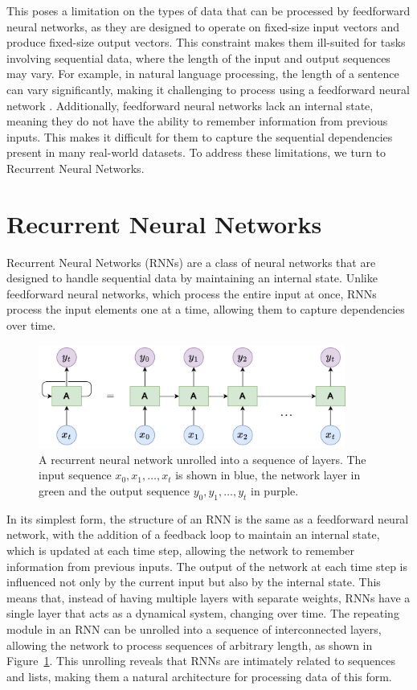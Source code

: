 \documentclass{article}
\newcommand{\reffig}[1]{Figure~\ref{#1}}
\begin{document}
This poses a limitation on the types of data that can be processed by feedforward neural
networks, as they are designed to operate on fixed-size input vectors and produce
fixed-size output vectors. This constraint makes them ill-suited for tasks involving
sequential data, where the length of the input and output sequences may vary. For example,
in natural language processing, the length of a sentence can vary significantly, making it
challenging to process using a feedforward neural network \cite{Sundermeyer2015}.
Additionally, feedforward neural networks lack an internal state, meaning they do not have
the ability to remember information from previous inputs. This makes it difficult for them
to capture the sequential dependencies present in many real-world datasets. To address
these limitations, we turn to Recurrent Neural Networks.



\section{Recurrent Neural Networks}
\label{ch:2}

Recurrent Neural Networks (RNNs) are a class of neural networks that are designed to
handle sequential data by maintaining an internal state. Unlike feedforward neural
networks, which process the entire input at once, RNNs process the input elements
one at a time, allowing them to capture dependencies over time.

\begin{figure}[htbp]
  \centering
  \includegraphics[width=0.9\textwidth]{RNN Unrolled.drawio.png}
  \caption{A recurrent neural network unrolled into a sequence of layers. The input
    sequence $x_0, x_1, \ldots, x_t$ is shown in blue, the network layer in green and the
    output sequence $y_0, y_1, \ldots, y_t$ in purple.}
  \label{fig:rnn-unrolled}
\end{figure}

In its simplest form, the structure of an RNN is the same as a feedforward neural network,
with the addition of a feedback loop to maintain an internal state, which is updated at
each time step, allowing the network to remember information from previous inputs. The
output of the network at each time step is influenced not only by the current input but
also by the internal state. This means that, instead of having multiple layers with
separate weights, RNNs have a single layer that acts as a dynamical system, changing over
time. The repeating module in an RNN can be unrolled into a sequence of interconnected
layers, allowing the network to process sequences of arbitrary length, as shown in
\reffig{fig:rnn-unrolled}. This unrolling reveals that RNNs are intimately related to
sequences and lists, making them a natural architecture for processing data of this form.
\end{document}
